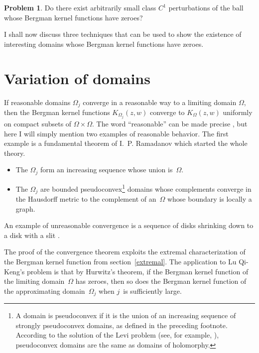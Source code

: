 \documentclass[12pt]{amsart}
\theoremstyle{definition}
\newtheorem{problem}{Problem}
\begin{document}
\begin{problem}
  Do there exist arbitrarily small class \(C^1\) perturbations of
  the ball whose Bergman kernel functions have zeroes?
\end{problem}

I shall now discuss three techniques that can be used to show the
existence of interesting domains whose Bergman kernel functions
have zeroes.

\section{Variation of domains}
\label{variation-domains}
If reasonable domains \(\Omega_j\) converge in a reasonable way
to a limiting domain \(\Omega\), then the Bergman kernel
functions \(K_{\Omega_j}(z,w)\) converge to \(K_\Omega(z,w)\)
uniformly on compact subsets of \(\Omega\times\Omega\).  The word
``reasonable'' can be made precise \cite{boasgeneric}, but here I
will simply mention two examples of reasonable behavior. The
first example is a fundamental theorem of I.~P. Ramadanov
\cite{ramadanov} which started the whole theory.
\begin{itemize}
\item The \(\Omega_j\) form an increasing sequence whose union
  is~\(\Omega\).
  
\item The \(\Omega_j\) are bounded pseudoconvex\footnote{A domain
is pseudoconvex if it is the union of an increasing sequence of
strongly pseudoconvex domains, as defined in the preceding
footnote. According to the solution of the Levi problem (see, for
example, \cite{Krantz}), pseudoconvex domains are the same as
domains of holomorphy.} domains whose complements converge in the
Hausdorff metric to the complement of an~\(\Omega\) whose
boundary is locally a graph.
\end{itemize}
An example of unreasonable convergence is a sequence of disks
shrinking down to a disk with a slit \cite{skwarczynski}.

The proof of the convergence theorem exploits the extremal
characterization of the Bergman kernel function from
section~\ref{extremal}. The application to Lu Qi-Keng's problem
is that by Hurwitz's theorem, if the Bergman kernel function of
the limiting domain~\(\Omega\) has zeroes, then so does the
Bergman kernel function of the approximating domain~\(\Omega_j\)
when \(j\)~is sufficiently large.
\end{document}

